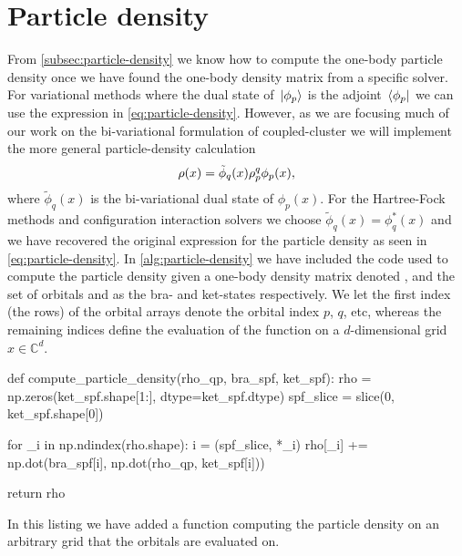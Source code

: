     \section{Particle density}
        \label{sec:particle-density}
        From \autoref{subsec:particle-density} we know how to compute the
        one-body particle density once we have found the one-body density matrix
        from a specific solver.
        For variational methods where the dual state of $\ket*{\phi_p}$ is the
        adjoint $\bra*{\phi_p}$ we can use the expression in
        \autoref{eq:particle-density}.
        However, as we are focusing much of our work on the bi-variational
        formulation of coupled-cluster we will implement the more general
        particle-density calculation
        \begin{align}
            \rho(x)
            = \tilde{\phi}_{q}(x)
            \rho^{q}_{p}
            \phi_p(x),
        \end{align}
        where $\tilde{\phi}_q(x)$ is the bi-variational dual state of
        $\phi_p(x)$.
        For the Hartree-Fock methods and configuration interaction solvers we
        choose $\tilde{\phi}_q(x) = \phi^{*}_q(x)$ and we have recovered the
        original expression for the particle density as seen in
        \autoref{eq:particle-density}.
        In \autoref{alg:particle-density} we have included the code used to
        compute the particle density given a one-body density matrix denoted
        , and the set of orbitals  and 
        as the bra- and ket-states respectively.
        We let the first index (the rows) of the orbital arrays denote the
        orbital index $p$, $q$, etc, whereas the remaining indices define the
        evaluation of the function on a $d$-dimensional grid $x \in
        \mathbb{C}^{d}$.
        \begin{algorithm}
            \begin{python}
def compute_particle_density(rho_qp, bra_spf, ket_spf):
    rho = np.zeros(ket_spf.shape[1:], dtype=ket_spf.dtype)
    spf_slice = slice(0, ket_spf.shape[0])

    for _i in np.ndindex(rho.shape):
        i = (spf_slice, *_i)
        rho[_i] += np.dot(bra_spf[i], np.dot(rho_qp, ket_spf[i]))

    return rho
            \end{python}
            \caption{In this listing we have added a function computing the
            particle density on an arbitrary grid that the orbitals are
            evaluated on.}
            \label{alg:particle-density}
        \end{algorithm}

